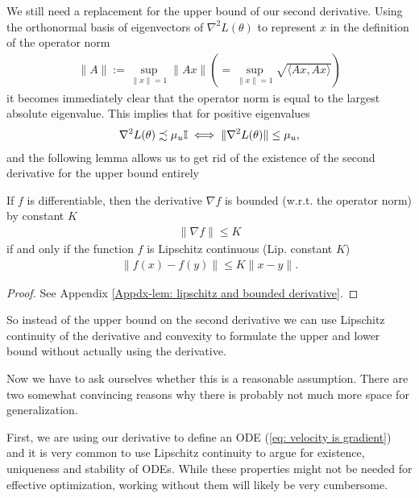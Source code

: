 We still need a replacement for the upper bound of our second derivative.
Using the orthonormal basis of eigenvectors of
\(\nabla^2 L(\theta)\) to represent \(x\) in the definition of the operator norm
%
\begin{align*}
	\|A\| := \sup_{\|x\| =1} \|Ax\|
	\left(= \sup_{\|x\| =1} \sqrt{\langle Ax, Ax\rangle}\right)
\end{align*}
%
it becomes immediately clear that the operator norm is equal to the largest
absolute eigenvalue. This implies that for positive eigenvalues 
%
\begin{align}
	\label{eq: operator norm upper bound relation}
	\nabla^2 L(\theta) \precsim \mu_u\mathbb{I}
	\iff \|\nabla^2 L(\theta)\|\le \mu_u,
\end{align}
%
and the following lemma allows us to get rid of the existence of the second
derivative for the upper bound entirely
%
\begin{lemma}\label{lem: lipschitz and bounded derivative}
	If \(f\) is differentiable, then the derivative \(\nabla f\) is
	bounded (w.r.t. the operator norm) by constant \(K\)
	\begin{align*}
		\|\nabla f\| \le K
	\end{align*}	
	if and only if the function
	\(f\) is Lipschitz continuous (Lip. constant \(K\))
	\begin{align*}
		\|f(x) - f(y)\| \le K \|x-y\|.
	\end{align*}
\end{lemma}
\begin{proof}
	See Appendix \ref{Appdx-lem: lipschitz and bounded derivative}.
\end{proof}
%
\noindent
So instead of the upper bound on the second derivative we can use Lipschitz
continuity of the derivative and convexity to formulate the upper and lower
bound without actually using the derivative.

Now we have to ask ourselves whether this  is a reasonable assumption. There
are two somewhat convincing reasons why there is probably not much more space
for generalization.

First, we are using our derivative to define an ODE (\ref{eq: velocity is
gradient}) and it is very common to use Lipschitz continuity to argue for
existence, uniqueness and stability of ODEs. While these properties might not
be needed for effective optimization, working without them will likely be very
cumbersome.

